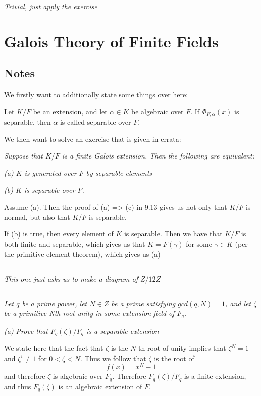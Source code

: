 \documentclass[11pt,oneside,titlepage]{book}
\begin{document}
\textit{Trivial, just apply the exercise}

\section{Galois Theory of Finite Fields}

\subsection*{Notes}

We firstly want to additionally state some things over here:

Let $K/F$ be an extension, and let $\alpha \in K$ be algebraic
over $F$. If $\Phi_{F, \alpha}(x)$ is separable, then $\alpha$
is called separable over $F$.

We then want to solve an exercise that is given in errata:

\textit{Suppose that $K/F$ is a finite Galois extension. Then the
following are equivalent:}

\textit{(a) $K$ is generated over $F$ by separable elements}

\textit{(b) $K$ is separable over $F$.}

Assume (a). Then the proof of (a) => (c) in 9.13 gives us not only that
$K/F$ is normal, but also that $K/F$ is separable.

If (b) is true, then every element of $K$ is separable. Then we have
that $K/F$ is both finite and separable, which gives us that $K =
F(\gamma)$ for some $\gamma \in K$ (per the primitive element
theorem), which gives us (a) 

\subsection{}

\textit{This one just asks us to make a diagram of $Z/12Z$}

\subsection{}

\textit{Let $q$ be a prime power, let $N \in Z$ be a prime satisfying
  $gcd(q, N) = 1$, and let $\zeta$ be a primitive Nth-root unity in some
  extension field of $F_q$.}

\textit{(a) Prove that $F_q(\zeta)/F_q$ is a separable extension}

We state here that the fact that $\zeta$ is the $N$-th root of unity
implies that $\zeta^N = 1$ and $\zeta^i \neq 1$ for $0 < \zeta < N$.
Thus we follow that $\zeta$ is the root of
$$f(x) = x^N - 1$$
and therefore $\zeta$ is algebraic over $F_q$. Therefore
$F_q(\zeta)/F_q$ is a finite extension, and thus $F_q(\zeta)$
is an algebraic extension of $F$. 
\end{document}

